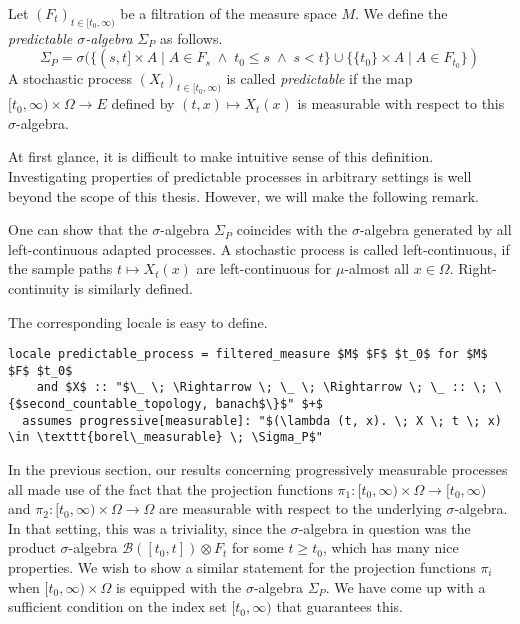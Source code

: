 \begin{definition}
	Let $(F_t)_{t\in[t_0, \infty)}$ be a filtration of the measure space $M$. We define the \textit{predictable $\sigma$-algebra} $\Sigma_P$ as follows.
	\[
		\Sigma_P = \sigma(\{(s,t] \times A \;\vert\; A \in F_s \;\wedge\; t_0 \le s \;\wedge\; s < t \} \cup \{\{t_0\} \times A \;\vert\; A \in F_{t_0}\})
	\]
	A stochastic process $(X_t)_{t\in[t_0, \infty)}$ is called \textit{predictable} if the map $[t_0, \infty) \times \Omega \rightarrow E$ defined by $(t,x) \mapsto X_t(x)$ is measurable with respect to this $\sigma$-algebra.
\end{definition}

At first glance, it is difficult to make intuitive sense of this definition. Investigating properties of predictable processes in arbitrary settings is well beyond the scope of this thesis. However, we will make the following remark.

\begin{remark}
	One can show that the $\sigma$-algebra $\Sigma_P$ coincides with the $\sigma$-algebra generated by all left-continuous adapted processes. A stochastic process is called left-continuous, if the sample paths $t \mapsto X_t(x)$ are left-continuous for $\mu$-almost all $x \in \Omega$. Right-continuity is similarly defined.
\end{remark}

The corresponding locale is easy to define.

\begin{isadefinition}
{\small
\begin{lstlisting}[style=isabelle]
locale predictable_process = filtered_measure $M$ $F$ $t_0$ for $M$ $F$ $t_0$
	and $X$ :: "$\_ \; \Rightarrow \; \_ \; \Rightarrow \; \_ :: \; \{$second_countable_topology, banach$\}$" $+$
  assumes progressive[measurable]: "$(\lambda (t, x). \; X \; t \; x) \in \texttt{borel\_measurable} \; \Sigma_P$"
\end{lstlisting}
}
\end{isadefinition}

In the previous section, our results concerning progressively measurable processes all made use of the fact that the projection functions $\pi_1 : [t_0, \infty) \times \Omega \rightarrow [t_0, \infty)$ and $\pi_2 : [t_0, \infty) \times \Omega \rightarrow \Omega$ are measurable with respect to the underlying $\sigma$-algebra. In that setting, this was a triviality, since the $\sigma$-algebra in question was the product $\sigma$-algebra $\mathcal{B}([t_0, t]) \otimes F_t$ for some $t \ge t_0$, which has many nice properties. We wish to show a similar statement for the projection functions $\pi_i$ when $[t_0, \infty) \times \Omega$ is equipped with the $\sigma$-algebra $\Sigma_P$. We have come up with a sufficient condition on the index set $[t_0, \infty)$ that guarantees this.

